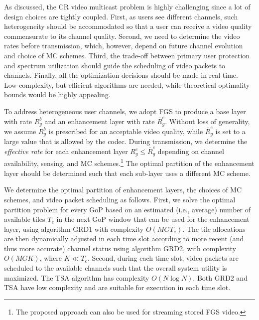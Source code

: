 \documentclass[12pt,onecolumn,draftclsnofoot]{IEEEtran} %
\begin{document}
As discussed, the CR video multicast problem is highly challenging since a lot of design choices are tightly coupled.  First, as users see different channels, such heterogeneity should be accommodated so that a user can receive a video quality commensurate to its channel quality. Second, we need to determine the video rates before transmission, which, however, depend on future channel evolution and choice of MC schemes.  Third, the trade-off between primary user protection and spectrum utilization should guide the scheduling of video packets to channels.  Finally, all the optimization decisions should be made in real-time.  Low-complexity, but efficient algorithms are needed, while theoretical optimality bounds would be highly appealing. 

To address heterogeneous user channels, we adopt FGS to produce a base layer with rate $R^b_g$ and an enhancement layer with rate $\bar{R}_g^e$. Without loss of generality, we assume $R^b_g$ is prescribed for an acceptable video quality, while $\bar{R}^e_g$ is set to a large value that is allowed by the codec.  During transmission, we determine the {\em effective rate} for each enhancement layer $R_g^e \leq \bar{R}^e_g$ depending on channel availability, sensing, and MC schemes.\footnote{The proposed approach can also be used for streaming stored FGS video.}  The optimal partition of the enhancement layer should be determined such that each sub-layer uses a different MC scheme.  

We determine the optimal partition of enhancement layers, the choices of MC schemes, and video packet scheduling as follows.  First, we solve the optimal partition problem for every GoP based on an estimated (i.e., average) number of available tiles $T_e$ in the next GoP window that can be used for the enhancement layer, using algorithm GRD1 with complexity $O(MGT_e)$. The tile allocations are then dynamically adjusted in each time slot according to more recent (and thus more accurate) channel status using algorithm GRD2, with complexity $O(MGK)$, where $K \ll T_e$.  Second, during each time slot, video packets are scheduled to the available channels such that the overall system utility is maximized. The TSA algorithm has complexity $O(N\log N)$. Both GRD2 and TSA have low complexity and are suitable for execution in each time slot. 
\end{document}
